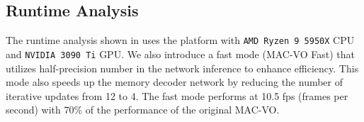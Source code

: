 \begin{table}[!t]
\centering
\caption{Time spent on each module of MAC-VO under different optimization with image resolution of $640\times 640$.}
\label{tab:RuntimeAnalysis}
\end{table}

\subsection{Runtime Analysis}

The runtime analysis shown in  uses the platform with \texttt{AMD Ryzen 9 5950X} CPU and \texttt{NVIDIA 3090 Ti} GPU.
We also introduce a fast mode (MAC-VO Fast) that utilizes half-precision number in the network inference to enhance efficiency.
This mode also speeds up the memory decoder network by reducing the number of iterative updates from 12 to 4. 
The fast mode performs at 10.5 fps (frames per second) with 70\% of the performance of the original MAC-VO.


